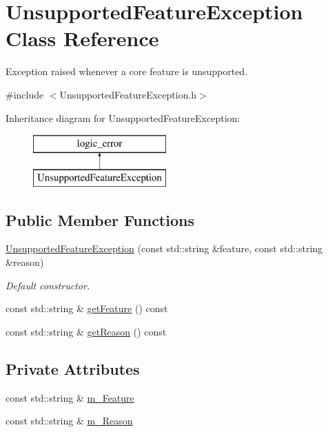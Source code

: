\hypertarget{class_unsupported_feature_exception}{}\section{Unsupported\+Feature\+Exception Class Reference}
\label{class_unsupported_feature_exception}


Exception raised whenever a core feature is unsupported.  




{\ttfamily \#include $<$Unsupported\+Feature\+Exception.\+h$>$}

Inheritance diagram for Unsupported\+Feature\+Exception\+:\begin{figure}[H]
\begin{center}
\leavevmode
\includegraphics[height=2.000000cm]{class_unsupported_feature_exception}
\end{center}
\end{figure}
\subsection*{Public Member Functions}
\begin{DoxyCompactItemize}
\item 
\hyperlink{class_unsupported_feature_exception_ab9261396c65882bea86a7a4f325e7350}{Unsupported\+Feature\+Exception} (const std\+::string \&feature, const std\+::string \&reason)
\begin{DoxyCompactList}\small\item\em Default constructor. \end{DoxyCompactList}\item 
const std\+::string \& \hyperlink{class_unsupported_feature_exception_aaadf83688501e488262257f527fc520b}{get\+Feature} () const 
\item 
const std\+::string \& \hyperlink{class_unsupported_feature_exception_af22845124ebf0afab42998d5babed4b4}{get\+Reason} () const 
\end{DoxyCompactItemize}
\subsection*{Private Attributes}
\begin{DoxyCompactItemize}
\item 
const std\+::string \& \hyperlink{class_unsupported_feature_exception_a517eaef16c6ed4468d71121cd6ea37d3}{m\+\_\+\+Feature}
\item 
const std\+::string \& \hyperlink{class_unsupported_feature_exception_a0d435f85891b5aea836729f196088ccf}{m\+\_\+\+Reason}
\end{DoxyCompactItemize}


